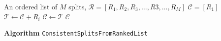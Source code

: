\documentclass[preview]{article}
\begin{document}
\begin{algorithm}
\begin{algorithmic}
\Require An ordered list of $M$ splits, $\mathcal{R} = [R_1, R_2, R_3, \ldots, R3, \ldots, R_M]$
\State $\mathcal{C} = [R_1]$
   \State $\mathcal{T} \leftarrow \mathcal{C} + R_i$ 
      \State $\mathcal{C} \leftarrow \mathcal{T}$
   \EndIf
\EndFor{}
\State\Return $\mathcal{C}$
\end{algorithmic}
\captionsetup{labelformat=empty}
\caption{\label{alg:ConsistentSplitsFromRankedList}\textbf{Algorithm} \texttt{ConsistentSplitsFromRankedList}}
\end{algorithm}
\end{document}
